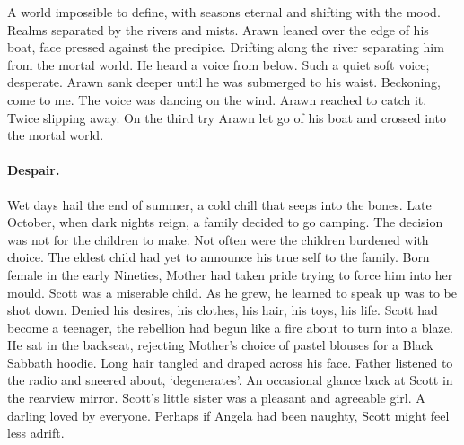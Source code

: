 
\prelude

A world impossible to define, with seasons eternal and shifting with
the mood. Realms separated by the rivers and mists. Arawn leaned over
the edge of his boat, face pressed against the precipice. Drifting
along the river separating him from the mortal world. He heard a voice
from below. Such a quiet soft voice; desperate. Arawn sank deeper
until he was submerged to his waist. Beckoning, come to me. The voice
was dancing on the wind. Arawn reached to catch it. Twice slipping
away. On the third try Arawn let go of his boat and crossed into the
mortal world.


\fugue

\paragraph{Despair.}

Wet days hail the end of summer, a cold chill that seeps into the
bones. Late October, when dark nights reign, a family decided to go
camping. The decision was not for the children to make. Not often were
the children burdened with choice. The eldest child had yet to
announce his true self to the family. Born female in the early
Nineties, Mother had taken pride trying to force him into her
mould. Scott was a miserable child. As he grew, he learned to speak up
was to be shot down. Denied his desires, his clothes, his hair, his
toys, his life. Scott had become a teenager, the rebellion had begun
like a fire about to turn into a blaze. He sat in the backseat,
rejecting Mother’s choice of pastel blouses for a Black Sabbath
hoodie. Long hair tangled and draped across his face. Father listened
to the radio and sneered about, `degenerates'. An occasional glance
back at Scott in the rearview mirror. Scott's little sister was a
pleasant and agreeable girl. A darling loved by everyone. Perhaps if
Angela had been naughty, Scott might feel less adrift.

